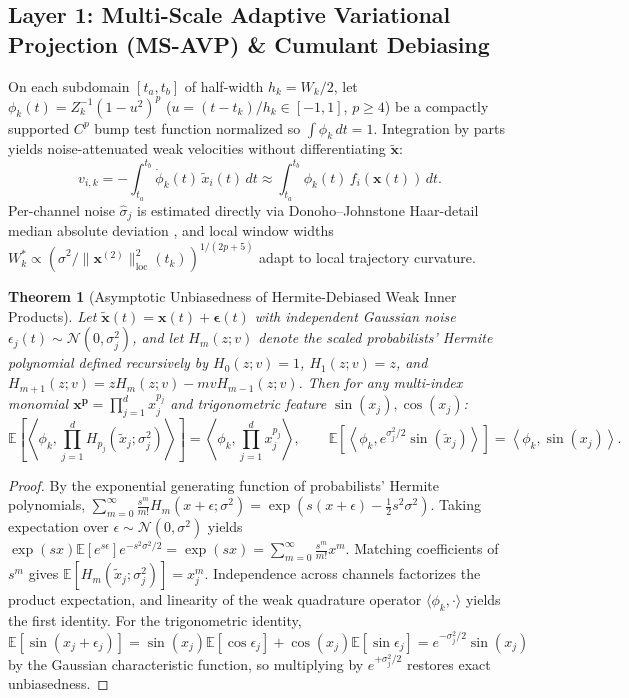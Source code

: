 \documentclass[11pt,a4paper]{article}
\newtheorem{theorem}{Theorem}
\begin{document}
\subsection{Layer 1: Multi-Scale Adaptive Variational Projection (MS-AVP) \& Cumulant Debiasing}
On each subdomain $[t_a, t_b]$ of half-width $h_k = W_k/2$, let $\phi_k(t) = Z_k^{-1}(1 - u^2)^p$ ($u=(t-t_k)/h_k \in [-1,1]$, $p \ge 4$) be a compactly supported $C^p$ bump test function normalized so $\int \phi_k\,dt = 1$. Integration by parts yields noise-attenuated weak velocities without differentiating $\tilde{\mathbf{x}}$:
\begin{equation}
  v_{i,k} = -\int_{t_a}^{t_b} \dot{\phi}_k(t)\,\tilde{x}_i(t)\,dt \approx \int_{t_a}^{t_b} \phi_k(t)\,f_i(\mathbf{x}(t))\,dt.
\end{equation}
Per-channel noise $\hat{\sigma}_j$ is estimated directly via Donoho--Johnstone Haar-detail median absolute deviation \cite{donoho1994ideal}, and local window widths $W_k^* \propto (\hat{\sigma}^2 / \|\mathbf{x}^{(2)}\|^2_{\text{loc}}(t_k))^{1/(2p+5)}$ adapt to local trajectory curvature.

\begin{theorem}[Asymptotic Unbiasedness of Hermite-Debiased Weak Inner Products]
\label{thm:hermite}
Let $\tilde{\mathbf{x}}(t) = \mathbf{x}(t) + \boldsymbol{\epsilon}(t)$ with independent Gaussian noise $\epsilon_j(t) \sim \mathcal{N}(0, \sigma_j^2)$, and let $H_m(z; v)$ denote the scaled probabilists' Hermite polynomial defined recursively by $H_0(z;v)=1$, $H_1(z;v)=z$, and $H_{m+1}(z;v) = z H_m(z;v) - m v H_{m-1}(z;v)$. Then for any multi-index monomial $\mathbf{x}^{\mathbf{p}} = \prod_{j=1}^d x_j^{p_j}$ and trigonometric feature $\sin(x_j), \cos(x_j)$:
\begin{equation}
  \mathbb{E}\!\left[\left\langle \phi_k, \prod_{j=1}^d H_{p_j}(\tilde{x}_j; \sigma_j^2) \right\rangle\right] = \left\langle \phi_k, \prod_{j=1}^d x_j^{p_j} \right\rangle, \qquad
  \mathbb{E}\!\left[\left\langle \phi_k, e^{\sigma_j^2/2}\sin(\tilde{x}_j) \right\rangle\right] = \left\langle \phi_k, \sin(x_j) \right\rangle.
\end{equation}
\end{theorem}
\begin{proof}
By the exponential generating function of probabilists' Hermite polynomials, $\sum_{m=0}^\infty \frac{s^m}{m!} H_m(x+\epsilon; \sigma^2) = \exp\!\left(s(x+\epsilon) - \frac{1}{2}s^2\sigma^2\right)$. Taking expectation over $\epsilon \sim \mathcal{N}(0,\sigma^2)$ yields $\exp(sx)\mathbb{E}[e^{s\epsilon}]e^{-s^2\sigma^2/2} = \exp(sx) = \sum_{m=0}^\infty \frac{s^m}{m!} x^m$. Matching coefficients of $s^m$ gives $\mathbb{E}[H_m(\tilde{x}_j;\sigma_j^2)] = x_j^m$. Independence across channels factorizes the product expectation, and linearity of the weak quadrature operator $\langle \phi_k, \cdot \rangle$ yields the first identity. For the trigonometric identity, $\mathbb{E}[\sin(x_j+\epsilon_j)] = \sin(x_j)\mathbb{E}[\cos\epsilon_j] + \cos(x_j)\mathbb{E}[\sin\epsilon_j] = e^{-\sigma_j^2/2}\sin(x_j)$ by the Gaussian characteristic function, so multiplying by $e^{+\sigma_j^2/2}$ restores exact unbiasedness.
\end{proof}
\end{document}
